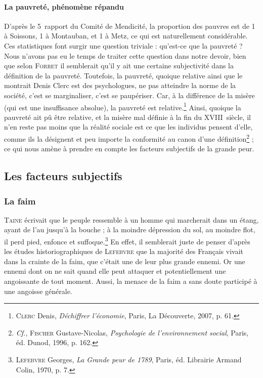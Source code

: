 \documentclass[a4paper,11pt,]{scrartcl}
\begin{document}
\paragraph{La pauvreté, phénomène répandu} D'après le 5\ieme~rapport du Comité de Mendicité, la proportion des pauvres est de 1 à Soissons, 1 à Montauban, et 1 à Metz, ce qui est naturellement considérable. Ces statistiques font surgir une question triviale : qu'est-ce que la pauvreté ? Nous n'avons pas eu le temps de traiter cette question dans notre devoir, bien que selon \textsc{Forret} il semblerait qu'il y ait une certaine subjectivité dans la définition de la pauvreté. Toutefois, la pauvreté, quoique relative ainsi que le montrait Denis Clerc est des psychologues, ne pas atteindre la norme de la société, \og c'est se marginaliser, c'est se paupériser. Car, à la différence de la misère (qui est une insuffisance absolue), la pauvreté est relative.\fg\footnote{\textsc{Clerc} Denis, \emph{D\'echiffrer l'\'economie}, Paris, La D\'ecouverte, 2007, p. 61.} Ainsi, quoique la pauvreté ait pû être relative, et la misère mal définie à la fin du XVIII\ieme~siècle, il n'en reste pas moins que la réalité sociale est ce que les individus pensent d'elle, comme ils la désignent et peu importe la conformité au canon d'une définition\footnote{\emph{Cf.}, \textsc{Fischer} Gustave-Nicolas, \emph{Psychologie de l'environnement social}, Paris, éd. Dunod, 1996, p. 162.} ; ce qui nous amène à prendre en compte les facteurs subjectifs de la grande peur.

\subsection{Les facteurs subjectifs}

\subsubsection{La faim}

\textsc{Taine} écrivait que le peuple \og ressemble à un homme qui marcherait dans un étang, ayant de l'au jusqu'à la bouche ; à la moindre dépression du sol, au moindre flot, il perd pied, enfonce et suffoque.\fg\footnote{\textsc{Lefebvre} Georges, \emph{La Grande peur de 1789}, Paris, éd. Librairie Armand Colin, 1970, p. 7.} En effet, il semblerait juste de penser d'après les études historiographiques de \textsc{Lefebvre} que la majorité des Français vivait dans la crainte de la faim, que c'était une de leur plus grande ennemi. Or une ennemi dont on ne sait quand elle peut attaquer et potentiellement une angoissante de tout moment. Aussi, la menace de la faim a sans doute participé à une angoisse générale.
\end{document}
